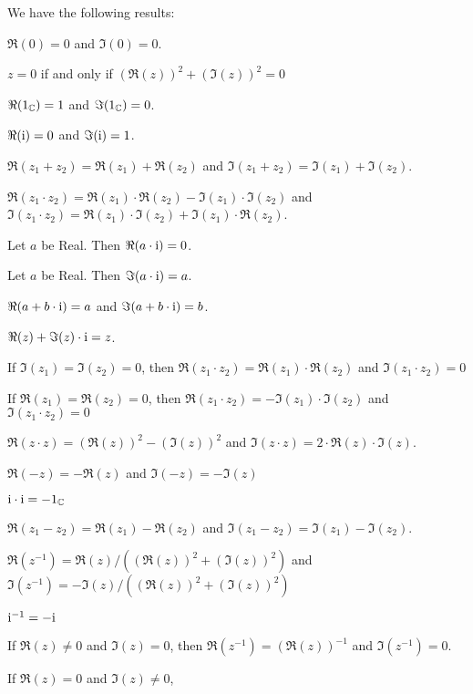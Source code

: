 \documentclass{article}
\begin{document}
We have the following results:
\begin{thm}
\item\label{complex1:4} $\Re(0)=0$ and $\Im(0)=0$.
\item\label{complex1:5} $z=0$ if and only if $(\Re(z))^{2}+(\Im(z))^{2}=0$
\item\label{complex1:6} $\Re(1_{\mathbb{C}})=1$ and $\Im(1_{\mathbb{C}})=0$.
\item\label{complex1:7} $\Re(\mathrm{i})=0$ and $\Im(\mathrm{i})=1$.
\item\label{complex1:8} $\Re(z_{1}+z_{2})=\Re(z_{1})+\Re(z_{2})$ and $\Im(z_{1}+z_{2})=\Im(z_{1})+\Im(z_{2})$.
\item\label{complex1:9} $\Re(z_{1}\cdot z_{2})=\Re(z_{1})\cdot\Re(z_{2})-\Im(z_{1})\cdot\Im(z_{2})$
  and $\Im(z_{1}\cdot z_{2})=\Re(z_{1})\cdot\Im(z_{2})+\Im(z_{1})\cdot\Re(z_{2})$.
\item\label{complex1:10} Let $a$ be Real. Then $\Re(a\cdot\mathrm{i})=0$.
\item\label{complex1:11} Let $a$ be Real. Then $\Im(a\cdot\mathrm{i})=a$.
\item\label{complex1:12} $\Re(a+b\cdot\mathrm{i})=a$ and $\Im(a+b\cdot\mathrm{i})=b$.
\item\label{complex1:13} $\Re(z)+\Im(z)\cdot\mathrm{i}=z$.
\item\label{complex1:14} If $\Im(z_{1})=\Im(z_{2})=0$, then
  $\Re(z_{1}\cdot z_{2})=\Re(z_{1})\cdot\Re(z_{2})$ and $\Im(z_{1}\cdot z_{2})=0$
\item\label{complex1:15} If $\Re(z_{1})=\Re(z_{2})=0$, then
  $\Re(z_{1}\cdot z_{2})=-\Im(z_{1})\cdot\Im(z_{2})$ and $\Im(z_{1}\cdot z_{2})=0$
\item\label{complex1:16} $\Re(z\cdot z)=(\Re(z))^{2}-(\Im(z))^{2}$
  and $\Im(z\cdot z)=2\cdot\Re(z)\cdot\Im(z)$.
\item\label{complex1:17} $\Re(-z)=-\Re(z)$ and $\Im(-z)=-\Im(z)$
\item\label{complex1:18} $\mathrm{i}\cdot\mathrm{i}=-1_{\mathbb{C}}$
\item\label{complex1:19} $\Re(z_{1}-z_{2})=\Re(z_{1})-\Re(z_{2})$
  and $\Im(z_{1}-z_{2})=\Im(z_{1})-\Im(z_{2})$.
\item\label{complex1:20} $\Re(z^{-1})=\Re(z)/((\Re(z))^{2}+(\Im(z))^{2})$
  and $\Im(z^{-1})=-\Im(z)/((\Re(z))^{2}+(\Im(z))^{2})$
\item\label{complex1:21} $\mathrm{i}^{-1}=-\mathrm{i}$
\item\label{complex1:22} If $\Re(z)\neq0$ and $\Im(z)=0$, then
  $\Re(z^{-1})=(\Re(z))^{-1}$ and $\Im(z^{-1})=0$.
\item\label{complex1:23} If $\Re(z)=0$ and $\Im(z)\neq0$,

\end{thm}
\end{document}
